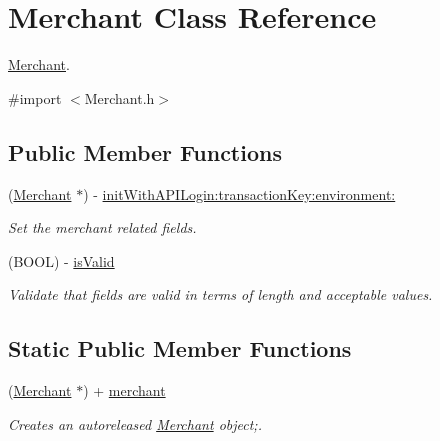 \hypertarget{interface_merchant}{
\section{Merchant Class Reference}
\label{interface_merchant}
}


\hyperlink{interface_merchant}{Merchant}.  




{\ttfamily \#import $<$Merchant.h$>$}

\subsection*{Public Member Functions}
\begin{DoxyCompactItemize}
\item 
(\hyperlink{interface_merchant}{Merchant} $\ast$) -\/ \hyperlink{interface_merchant_afc3535a77c0dae4b2a95a074a411ec91}{initWithAPILogin:transactionKey:environment:}
\begin{DoxyCompactList}\small\item\em Set the merchant related fields. \item\end{DoxyCompactList}\item 
(BOOL) -\/ \hyperlink{interface_merchant_a89a03638ddad68187baa49ed00e53d6f}{isValid}
\begin{DoxyCompactList}\small\item\em Validate that fields are valid in terms of length and acceptable values. \item\end{DoxyCompactList}\end{DoxyCompactItemize}
\subsection*{Static Public Member Functions}
\begin{DoxyCompactItemize}
\item 
(\hyperlink{interface_merchant}{Merchant} $\ast$) + \hyperlink{interface_merchant_a1e8a81b4bd4f99847b52535b06012bbc}{merchant}
\begin{DoxyCompactList}\small\item\em Creates an autoreleased \hyperlink{interface_merchant}{Merchant} object;. \item\end{DoxyCompactList}\end{DoxyCompactItemize}
